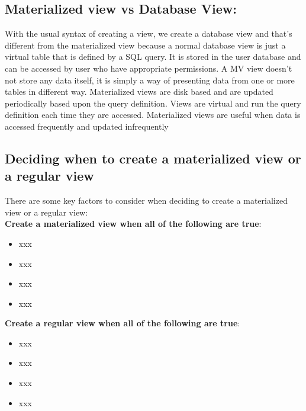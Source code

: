 \subsection{Materialized view vs Database View:} With the usual syntax of creating a view, we create a database view  and that's different from the materialized view because a normal database view is just a virtual table that is defined by a SQL query. It is stored in the user database and can be accessed by user who have appropriate permissions. A MV view doesn't not store any data itself, it is simply  a way of presenting data from one  or more tables in different way. Materialized views are disk based and are updated periodically based upon the query definition.\cite{Stackoverflow-author-08-2008} Views are virtual and run the query definition each time they are accessed. Materialized views are useful when data is accessed frequently and updated infrequently


\subsection{Deciding when to create a materialized view or a regular view}
There are some key factors to consider when deciding to create a materialized view or a regular view:\\

\textbf{Create a materialized view when all of the following are true}:
\begin{itemize}
    \item xxx
    \item xxx
    \item xxx
    \item xxx
\end{itemize}

\textbf{Create a regular view when all of the following are true}:
\begin{itemize}
    \item xxx
    \item xxx
    \item xxx
    \item xxx
\end{itemize}

